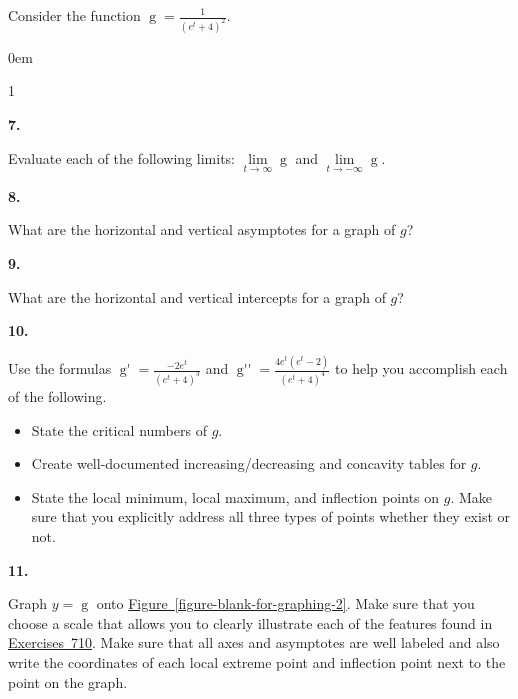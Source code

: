 \documentclass[12pt,]{book}
\theoremstyle{plain}
\theoremstyle{definition}
\numberwithin{equation}{section}
\newenvironment{exercisegroup}%
{\medskip\noindent}%
{\par\bigskip}%
\newlength{\exercisegroupindent}%
\newlength{\exercisegroupitemwidth}%
\newenvironment{exercisegrouplist}%
{\vspace{-\partopsep}%
\begin{adjustwidth}{\exercisegroupindent}{0em}}%
{\end{adjustwidth}%
\vspace{-\partopsep}%
\vspace{\baselineskip}}%
\newenvironment{exercisegroupbycol}[1]%
{\begin{exercisegrouplist}%
\vspace{-\multicolsep}%
\begin{multicols}{#1}%
\setlength{\parindent}{0em}%
\setlength{\exercisegroupitemwidth}{\linewidth}}%
{\end{multicols}%
\vspace{-\multicolsep}%
\end{exercisegrouplist}}%
\newenvironment{exercisegroupitem}[1]%
{\begin{minipage}[t]{\exercisegroupitemwidth}
\vspace{0pt}%
{\bfseries#1}%
\rule{0pt}{\baselineskip}}{\strut%
\end{minipage}%
\hspace{\columnsep}}%
\providecommand\phantomsection{}
\newcommand{\fe}[2]{\mathop{{#1}{\left(#2\right)}}}
\newcommand{\fd}[1]{#1'}
\newcommand{\sd}[1]{#1''}
\begin{document}
\begin{exercisegroup}%
Consider the function \(\fe{g}{t}=\frac{1}{(e^t+4)^2}\).%
\par
\begin{exercisegroupbycol}{1}%
\begin{exercisegroupitem}{7. }\phantomsection\hypertarget{exercise-sketch-second-asymptotes}{\null}
Evaluate each of the following limits: \(\lim\limits_{t\to\infty}\fe{g}{t}\) and \(\lim\limits_{t\to-\infty}\fe{g}{t}\).%
\end{exercisegroupitem}%
\par%
\begin{exercisegroupitem}{8. }\phantomsection\hypertarget{exercise-65}{\null}
What are the horizontal and vertical asymptotes for a graph of \(g\)?%
\end{exercisegroupitem}%
\par%
\begin{exercisegroupitem}{9. }\phantomsection\hypertarget{exercise-66}{\null}
What are the horizontal and vertical intercepts for a graph of \(g\)?%
\end{exercisegroupitem}%
\par%
\begin{exercisegroupitem}{10. }\phantomsection\hypertarget{exercise-sketch-second-critical-numbers}{\null}
Use the formulas \(\fe{\fd{g}}{t}=\frac{-2e^t}{(e^t+4)^3}\) and \(\fe{\sd{g}}{t}=\frac{4e^t(e^t-2)}{(e^t+4)^4}\) to help you accomplish each of the following.%
\begin{itemize}[label=\textbullet]
\item{}State the critical numbers of \(g\).\item{}Create well-documented increasing/decreasing and concavity tables for \(g\).\item{}State the local minimum, local maximum, and inflection points on \(g\).  Make sure that you explicitly address all three types of points whether they exist or not.\end{itemize}
\par
%
\end{exercisegroupitem}%
\par%
\begin{exercisegroupitem}{11. }\phantomsection\hypertarget{exercise-68}{\null}
Graph \(y=\fe{g}{t}\) onto \hyperref[figure-blank-for-graphing-2]{Figure~\ref*{figure-blank-for-graphing-2}}. Make sure that you choose a scale that allows you to clearly illustrate each of the features found in \hyperref[exercise-sketch-second-asymptotes]{Exercises~7}\textendash{}\hyperref[exercise-sketch-second-critical-numbers]{10}.  Make sure that all axes and asymptotes are well labeled and also write the coordinates of each local extreme point and inflection point next to the point on the graph.%

\end{exercisegroupitem}
\end{exercisegroupbycol}
\end{exercisegroup}
\end{document}

